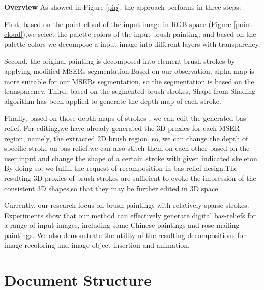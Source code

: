 \textbf{Overview}  As showed in Figure \ref{pip}, the approach performs in three steps:

First, based on the point cloud of the input image in RGB space (Figure \ref{point cloud}),we select the palette colors of the input brush painting, and based on the palette colors we decompose a input image into different layers with transparency.  

Second,  the original painting is decomposed into element brush strokes by applying modified MSERs segmentation.Based on our observation, alpha map is more suitable for our MSERs segmentation, so the segmentation is based on the transparency. Third, based on the segmented brush strokes,  Shape from Shading algorithm has been applied to generate the depth map of each stroke.  

Finally, based on those depth maps of strokes , we can edit the generated bas relief. For editing,we have already generated the 3D proxies for each MSER region, namely, the extracted 2D brush region, so, we can change the depth of specific stroke on bas relief,we can also stitch them on each other based on the user input and change the shape of a certain stroke with given indicated skeleton. By doing so, we fulfill the request of recomposition in bas-relief design.The resulting 3D proxies of brush strokes are sufficient to evoke the impression of the consistent 3D shapes,so that they may be further edited in 3D space. 

Currently, our research focus on brush paintings with relatively sparse strokes. Experiments show that our method can effectively generate digital bas-reliefs for a range of input images, including some Chinese paintings and rose-mailing paintings. We also demonstrate the utility of the resulting decompositions for image recoloring and image object insertion and animation.

\section{Document Structure}


\newpage